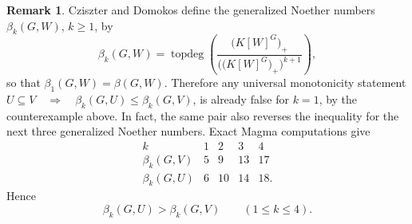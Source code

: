 \documentclass[11pt]{article}
\theoremstyle{definition}
\newtheorem{remark}[theorem]{Remark}
\begin{document}
	
	\begin{remark}
		Cziszter and Domokos define the generalized Noether numbers
		\(\beta_k(G,W)\), \(k\geq1\), by
		\[
		\beta_k(G,W)
		=
		\operatorname{topdeg}
		\left(
		\frac{\bigl(K[W]^G\bigr)_+}{\bigl(\bigl(K[W]^G\bigr)_+\bigr)^{k+1}}
		\right),
		\]
		so that $\beta_1(G,W)=\beta(G,W)$. Therefore any universal monotonicity statement $U\subseteq V \quad\Longrightarrow\quad \beta_k(G,U)\leq\beta_k(G,V)$, is already false for \(k=1\), by the counterexample above. In fact, the same pair also reverses the inequality for the next three generalized Noether numbers. Exact Magma computations give
		\[
		\begin{array}{c|cccc}
			k&1&2&3&4\\ \hline
			\beta_k(G,V)&5&9&13&17\\
			\beta_k(G,U)&6&10&14&18.
		\end{array}
		\]
		Hence
		\[
		\beta_k(G,U)>\beta_k(G,V)
		\qquad (1\leq k\leq4).
		\]
		
	\end{remark}
	
\end{document}
